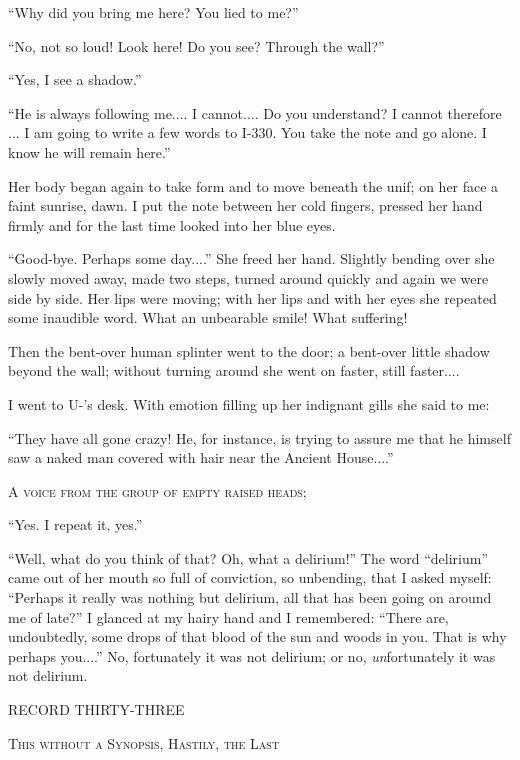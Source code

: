 \documentclass[11pt,openany]{book}
\begin{document}
``Why did you bring me here? You lied to me?''

``No, not so loud! Look here! Do you see? Through the wall?''

``Yes, I see a shadow.''

``He is always following me.... I cannot.... Do you understand? I cannot therefore ... I am going to write a few words to I-330. You take the note and go alone. I know he will remain here.''

Her body began again to take form and to move beneath the unif; on her face a faint sunrise, dawn. I put the note between her cold fingers, pressed her hand firmly and for the last time looked into her blue eyes.

``Good-bye. Perhaps some day....'' She freed her hand. Slightly bending over she slowly moved away, made two steps, turned around quickly and again we were side by side. Her lips were moving; with her lips and with her eyes she repeated some inaudible word. What an unbearable smile! What suffering!

Then the bent-over human splinter went to the door; a bent-over little shadow beyond the wall; without turning around she went on faster, still faster....

I went to U-'s desk. With emotion filling up her indignant gills she said to me:

``They have all gone crazy! He, for instance, is trying to assure me that he himself saw a naked man covered with hair near the Ancient House....''

\begin{center}\textsc{A voice from the group of empty raised heads;}\end{center}

``Yes. I repeat it, yes.''

``Well, what do you think of that? Oh, what a delirium!'' The word ``delirium'' came out of her mouth so full of conviction, so unbending, that I asked myself: ``Perhaps it really was nothing but delirium, all that has been going on around me of late?'' I glanced at my hairy hand and I remembered: ``There are, undoubtedly, some drops of that blood of the sun and woods in you. That is why perhaps you....'' No, fortunately it was not delirium; or no, \emph{un}fortunately it was not delirium.

\begin{center}\textsc{RECORD THIRTY-THREE}\end{center}

\begin{center}\textsc{This without a Synopsis, Hastily, the Last}\end{center}
\end{document}
